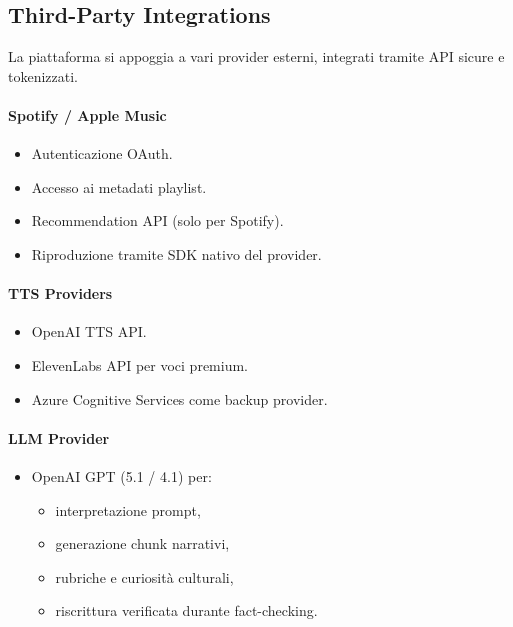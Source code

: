 \documentclass[11pt,a4paper]{article}
\begin{document}

\subsection{Third-Party Integrations}

La piattaforma si appoggia a vari provider esterni, integrati tramite API sicure e tokenizzati.

\paragraph{Spotify / Apple Music}
\begin{itemize}
    \item Autenticazione OAuth.
    \item Accesso ai metadati playlist.
    \item Recommendation API (solo per Spotify).
    \item Riproduzione tramite SDK nativo del provider.
\end{itemize}

\paragraph{TTS Providers}
\begin{itemize}
    \item OpenAI TTS API.
    \item ElevenLabs API per voci premium.
    \item Azure Cognitive Services come backup provider.
\end{itemize}

\paragraph{LLM Provider}
\begin{itemize}
    \item OpenAI GPT (5.1 / 4.1) per:
    \begin{itemize}
        \item interpretazione prompt,
        \item generazione chunk narrativi,
        \item rubriche e curiosità culturali,
        \item riscrittura verificata durante fact-checking.
    \end{itemize}
\end{itemize}
\end{document}
